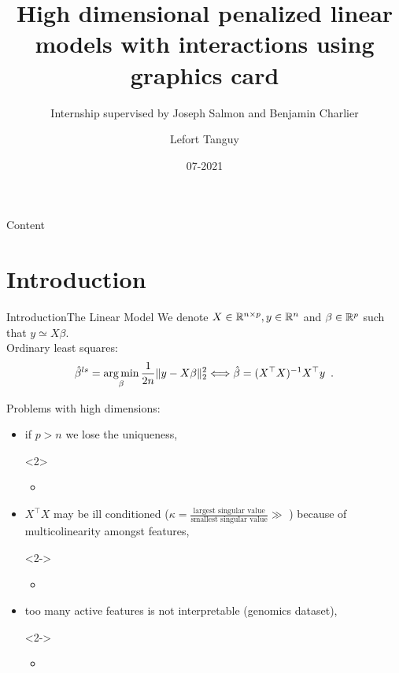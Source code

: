 \documentclass[10pt,aspectratio=43]{beamer}
\title[] %
{High dimensional penalized linear models with interactions using graphics card
} %
\subtitle{Internship supervised by Joseph Salmon and Benjamin Charlier}
\date{07-2021} %
\author[]%
{%
	{Lefort Tanguy}%
}
\institute[
]
{%
    University of Montpellier
}
\begin{document}
\maketitle


\begin{frame}{Content}{}
    \tableofcontents
\end{frame}

\section*{Introduction}

\begin{frame}{Introduction}{The Linear Model}
We denote $X \in \mathbb{R}^{n \times p}, y \in \mathbb{R}^n$ and
$\beta \in \mathbb{R}^p$ such that $y\simeq X\beta$. \\
Ordinary least squares:
\[\hat\beta^{ls} = \mathop{\mathrm{arg\,min}}_{\beta} \frac{1}{2n}\|y-X\beta\|_2^2
\Longleftrightarrow \hat \beta = (X^\top X)^{-1}X^\top y \enspace.\]

Problems with high dimensions:
\begin{itemize}
\item if $p>n$ we lose the uniqueness,
\begin{onlyenv}<2>
    \begin{itemize}
        \item  \color{red}{make the problem strictly convex.}
    \end{itemize}
\end{onlyenv}
\item $X^\top X$ may be ill conditioned
($\kappa = \frac{\text{largest singular value}}{
    \text{smallest singular value}} \gg $ )
    because of multicolinearity amongst features,
\begin{onlyenv}<2->
    \begin{itemize}
        \item \color{red}{Shift spectrum by a small quantity using
        $\ell_2$ penalty.}
    \end{itemize}
\end{onlyenv}
\item too many active features is not interpretable (genomics dataset),
\begin{onlyenv}<2->
    \begin{itemize}
        \item \color{red}{Feature selection using $\ell_1$ penalty.}
    \end{itemize}
\end{onlyenv}\end{itemize}
\end{frame}
\end{document}
